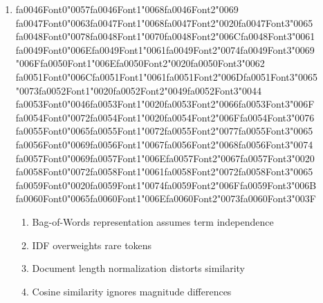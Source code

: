 \documentclass[12pt]{article}
\begin{document}
\begin{enumerate}[label=Q\arabic*.]
 \item {\csname fa0046Font0\endcsname\char"0057}{\csname fa0046Font1\endcsname\char"0068}{\csname fa0046Font2\endcsname\char"0069} {\csname fa0047Font0\endcsname\char"0063}{\csname fa0047Font1\endcsname\char"0068}{\csname fa0047Font2\endcsname\char"0020}{\csname fa0047Font3\endcsname\char"0065} {\csname fa0048Font0\endcsname\char"0078}{\csname fa0048Font1\endcsname\char"0070}{\csname fa0048Font2\endcsname\char"006C}{\csname fa0048Font3\endcsname\char"0061} {\csname fa0049Font0\endcsname\char"006E}{\csname fa0049Font1\endcsname\char"0061}{\csname fa0049Font2\endcsname\char"0074}{\csname fa0049Font3\endcsname\char"0069} {\char"006F}{\csname fa0050Font1\endcsname\char"006E}{\csname fa0050Font2\endcsname\char"0020}{\csname fa0050Font3\endcsname\char"0062} {\csname fa0051Font0\endcsname\char"006C}{\csname fa0051Font1\endcsname\char"0061}{\csname fa0051Font2\endcsname\char"006D}{\csname fa0051Font3\endcsname\char"0065} {\char"0073}{\csname fa0052Font1\endcsname\char"0020}{\csname fa0052Font2\endcsname\char"0049}{\csname fa0052Font3\endcsname\char"0044} {\csname fa0053Font0\endcsname\char"0046}{\csname fa0053Font1\endcsname\char"0020}{\csname fa0053Font2\endcsname\char"0066}{\csname fa0053Font3\endcsname\char"006F} {\csname fa0054Font0\endcsname\char"0072}{\csname fa0054Font1\endcsname\char"0020}{\csname fa0054Font2\endcsname\char"006F}{\csname fa0054Font3\endcsname\char"0076} {\csname fa0055Font0\endcsname\char"0065}{\csname fa0055Font1\endcsname\char"0072}{\csname fa0055Font2\endcsname\char"0077}{\csname fa0055Font3\endcsname\char"0065} {\csname fa0056Font0\endcsname\char"0069}{\csname fa0056Font1\endcsname\char"0067}{\csname fa0056Font2\endcsname\char"0068}{\csname fa0056Font3\endcsname\char"0074} {\csname fa0057Font0\endcsname\char"0069}{\csname fa0057Font1\endcsname\char"006E}{\csname fa0057Font2\endcsname\char"0067}{\csname fa0057Font3\endcsname\char"0020} {\csname fa0058Font0\endcsname\char"0072}{\csname fa0058Font1\endcsname\char"0061}{\csname fa0058Font2\endcsname\char"0072}{\csname fa0058Font3\endcsname\char"0065} {\csname fa0059Font0\endcsname\char"0020}{\csname fa0059Font1\endcsname\char"0074}{\csname fa0059Font2\endcsname\char"006F}{\csname fa0059Font3\endcsname\char"006B} {\csname fa0060Font0\endcsname\char"0065}{\csname fa0060Font1\endcsname\char"006E}{\csname fa0060Font2\endcsname\char"0073}{\csname fa0060Font3\endcsname\char"003F}
 \begin{enumerate}[label=(\Alph*)]
     \item Bag-of-Words representation assumes term independence
     \item IDF overweights rare tokens
     \item Document length normalization distorts similarity
     \item Cosine similarity ignores magnitude differences
 \end{enumerate}
 

\end{enumerate}
\end{document}
